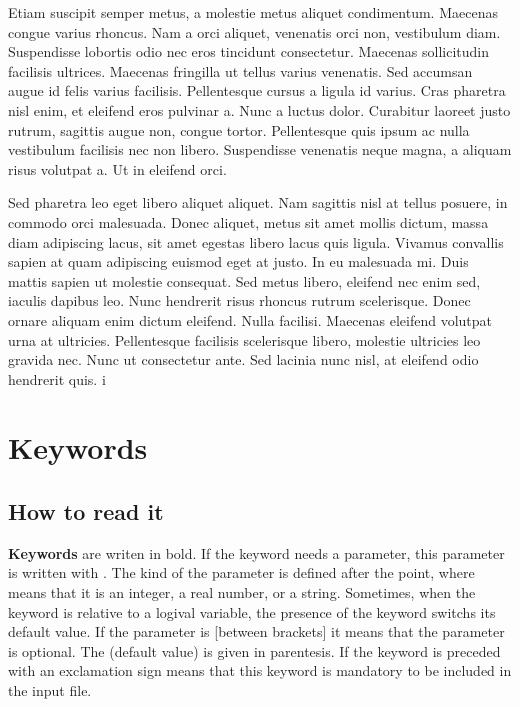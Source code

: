 \documentclass[letterpaper,10pt,english]{sphinxmanual}
\begin{document}
Etiam suscipit semper metus, a molestie metus aliquet condimentum. Maecenas
congue varius rhoncus. Nam a orci aliquet, venenatis orci non, vestibulum diam.
Suspendisse lobortis odio nec eros tincidunt consectetur. Maecenas sollicitudin
facilisis ultrices. Maecenas fringilla ut tellus varius venenatis. Sed accumsan
augue id felis varius facilisis. Pellentesque cursus a ligula id varius. Cras
pharetra nisl enim, et eleifend eros pulvinar a. Nunc a luctus dolor. Curabitur
laoreet justo rutrum, sagittis augue non, congue tortor. Pellentesque quis
ipsum ac nulla vestibulum facilisis nec non libero. Suspendisse venenatis neque
magna, a aliquam risus volutpat a. Ut in eleifend orci.

Sed pharetra leo eget libero aliquet aliquet. Nam sagittis nisl at tellus
posuere, in commodo orci malesuada. Donec aliquet, metus sit amet mollis
dictum, massa diam adipiscing lacus, sit amet egestas libero lacus quis ligula.
Vivamus convallis sapien at quam adipiscing euismod eget at justo. In eu
malesuada mi. Duis mattis sapien ut molestie consequat. Sed metus libero,
eleifend nec enim sed, iaculis dapibus leo. Nunc hendrerit risus rhoncus rutrum
scelerisque. Donec ornare aliquam enim dictum eleifend. Nulla facilisi.
Maecenas eleifend volutpat urna at ultricies. Pellentesque facilisis
scelerisque libero, molestie ultricies leo gravida nec. Nunc ut consectetur
ante. Sed lacinia nunc nisl, at eleifend odio hendrerit quis.  i


\chapter{Keywords}
\label{keywords:keywords}\label{keywords::doc}

\section{How to read it}
\label{keywords:how-to-read-it}
\textbf{Keywords} are writen in bold. If the keyword needs a parameter, this
parameter is written with . The kind of the parameter is defined
after the point, where  means that it is an integer,  a real
number, or  a string. Sometimes, when the keyword is relative to a
logival variable, the presence of the keyword switchs its default value. If
the parameter is {[}between brackets{]} it means that the parameter is optional.
The (default value) is given in parentesis.  If the keyword is preceded with
an exclamation sign means that this keyword is mandatory to be included in the
input file.
\end{document}
